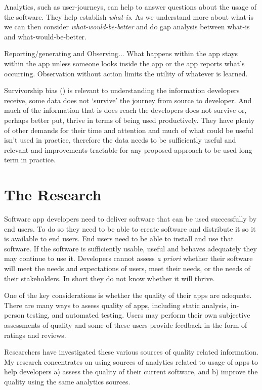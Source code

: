 Analytics, such as user-journeys, can help to answer questions about the usage of the software. They help establish \emph{what-is}. As we understand more about what-is we can then consider \emph{what-would-be-better} and do gap analysis between what-is and what-would-be-better.

Reporting/generating and Observing... What happens within the app stays within the app unless someone looks inside the app or the app reports what's occurring. Observation without action limits the utility of whatever is learned. 

Survivorship bias (\cite{wikipedia_survivorship_bias}) is relevant to understanding the information developers receive, some data does not `survive' the journey from source to developer. And much of the information that is does reach the developers does not survive or, perhaps better put, thrive in terms of being used productively. They have plenty of other demands for their time and attention and much of what could be useful isn't used in practice, therefore the data needs to be sufficiently useful and relevant and improvements tractable for any proposed approach to be used long term in practice.



\section{The Research}
Software app developers need to deliver software that can be used successfully by end users. To do so they need to be able to create software and distribute it so it is available to end users. End users need to be able to install and use that software. If the software is sufficiently usable, useful and behaves adequately they may continue to use it. Developers cannot assess \emph{a priori} whether their software will meet the needs and expectations of users, meet their needs, or the needs of their stakeholders. In short they do not know whether it will thrive.

One of the key considerations is whether the quality of their apps are adequate. There are many ways to assess quality of apps, including static analysis, in-person testing, and automated testing. Users may perform their own subjective assessments of quality and some of these users provide feedback in the form of ratings and reviews. 

Researchers have investigated these various sources of quality related information. My research concentrates on using sources of analytics related to usage of apps to help developers a) assess the quality of their current software, and b) improve the quality using the same analytics sources.

